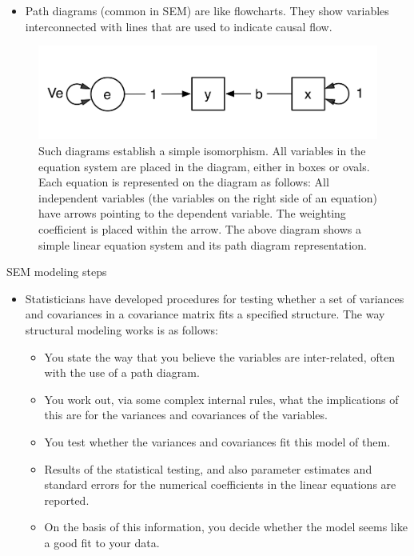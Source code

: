 \documentclass[11pt,dvipsnames,ignorenonframetext,aspectratio=169]{beamer}
\providecommand{\tightlist}{%
  \setlength{\itemsep}{0pt}\setlength{\parskip}{0pt}}
\begin{document}
\begin{frame}{}
\protect\hypertarget{section-2}{}
\begin{itemize}
\tightlist
\item
  Path diagrams (common in SEM) are like flowcharts. They show variables
  interconnected with lines that are used to indicate causal flow.
\end{itemize}

\begin{figure}
\includegraphics[width=0.8\linewidth]{../images/structural_equation} \caption{Such diagrams establish a simple isomorphism. All variables in the equation system are placed in the diagram, either in boxes or ovals. Each equation is represented on the diagram as follows: All independent variables (the variables on the right side of an equation) have arrows pointing to the dependent variable. The weighting coefficient is placed within the arrow. The above diagram shows a simple linear equation system and its path diagram representation.}\label{fig:simple-linear-path}
\end{figure}
\end{frame}

\begin{frame}{SEM modeling steps}
\protect\hypertarget{sem-modeling-steps}{}
\begin{itemize}
\tightlist
\item
  Statisticians have developed procedures for testing whether a set of
  variances and covariances in a covariance matrix fits a specified
  structure. The way structural modeling works is as follows:

  \begin{itemize}
  \tightlist
  \item
    You state the way that you believe the variables are inter-related,
    often with the use of a path diagram.
  \item
    You work out, via some complex internal rules, what the implications
    of this are for the variances and covariances of the variables.
  \item
    You test whether the variances and covariances fit this model of
    them.
  \item
    Results of the statistical testing, and also parameter estimates and
    standard errors for the numerical coefficients in the linear
    equations are reported.
  \item
    On the basis of this information, you decide whether the model seems
    like a good fit to your data.
  \end{itemize}
\end{itemize}
\end{frame}
\end{document}
